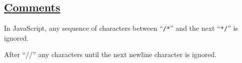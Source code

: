 \subsection*{\href{https://sourceacademy.org/sicpjs/2.2.3\#footnote-8}{Comments}}

In JavaScript, any sequence of characters between ``\texttt{/*}'' and
the next ``\texttt{*/}'' is ignored.

After ``//'' any characters until the next newline character is ignored.
